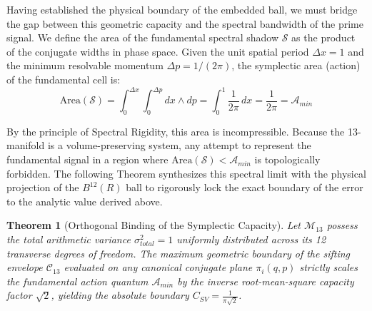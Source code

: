 \documentclass[sn-mathphys-num, pdflatex, referee]{sn-jnl}
\newtheorem{theorem}{Theorem}[section]
\begin{document}
Having established the physical boundary of the embedded ball, we must bridge the gap between this geometric capacity and the spectral bandwidth of the prime signal. We define the area of the fundamental spectral shadow $\mathcal{S}$ as the product of the conjugate widths in phase space. Given the unit spatial period $\Delta x = 1$ and the minimum resolvable momentum $\Delta p = 1/(2\pi)$, the symplectic area (action) of the fundamental cell is:
\begin{equation}
\label{eq:spectral_shadow}
\text{Area}(\mathcal{S}) = \int_{0}^{\Delta x} \int_{0}^{\Delta p} dx \wedge dp = \int_{0}^{1} \frac{1}{2\pi} \, dx = \frac{1}{2\pi} = \mathcal{A}_{min}
\end{equation}

By the principle of Spectral Rigidity, this area is incompressible. Because the 13-manifold is a volume-preserving system, any attempt to represent the fundamental signal in a region where $\text{Area}(\mathcal{S}) < \mathcal{A}_{min}$ is topologically forbidden. The following Theorem synthesizes this spectral limit with the physical projection of the $B^{12}(R)$ ball to rigorously lock the exact boundary of the error to the analytic value derived above.

\begin{theorem}[Orthogonal Binding of the Symplectic Capacity]
\label{the:orthogonal_binding}
\textit{Let $\mathcal{M}_{13}$ possess the total arithmetic variance $\sigma_{total}^2 = 1$ uniformly distributed across its 12 transverse degrees of freedom. The maximum geometric boundary of the sifting envelope $\mathcal{C}_{13}$ evaluated on any canonical conjugate plane $\pi_i(q, p)$ strictly scales the fundamental action quantum $\mathcal{A}_{min}$ by the inverse root-mean-square capacity factor $\sqrt{2}$, yielding the absolute boundary $C_{SV} = \frac{1}{\pi\sqrt{2}}$.}
\end{theorem}
\end{document}
